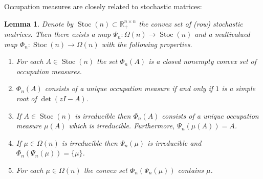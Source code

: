 \documentclass{amsart}
\newcommand{\R}{\mathbb{R}}
\newcommand{\0}{\mathbf{0}}
\newcommand{\1}{\mathbf{1}}
\newtheorem{lemma}[theo]{Lemma}
\theoremstyle{remark}
\numberwithin{equation}{section} %
\begin{document}
%
Occupation measures are closely related to stochastic matrices:
%
\begin{lemma}\label{ocmstocmat}  Denote by $\operatorname{Stoc}(n)\subset \R_+^{n\times n}$ the convex set of (row) stochastic matrices.  Then there exists  a map  $\Psi_n: \Omega(n)\to \operatorname{Stoc}(n)$ and a multivalued map
$\Phi_n: \operatorname{Stoc}(n)\to\Omega(n)$
with the following properties.
\begin{enumerate}
\item For each $A\in \operatorname{Stoc}(n)$ the set $\Phi_n(A)$ is a closed nonempty 
%
convex set of occupation measures. 
\item $\Phi_n(A)$ consists of a unique occupation measure if and only if $1$ is a simple root of $\det(zI-A)$.
\item If $A\in \operatorname{Stoc}(n)$ is irreducible then $\Phi_n(A)$ consists of a unique occupation measure $\mu(A)$ which is irreducible.  Furthermore, $\Psi_n(\mu(A))=A$. 
\item If $\mu\in\Omega(n)$ is irreducible then
$\Psi_n(\mu)$ is irreducible  and  $\Phi_n(\Psi_n(\mu))=\{\mu\}$.
\item For each $\mu\in\Omega(n)$ the convex set $\Phi_n(\Psi_n(\mu))$ contains $\mu$.


 \end{enumerate}
 \end{lemma} 
\end{document}

